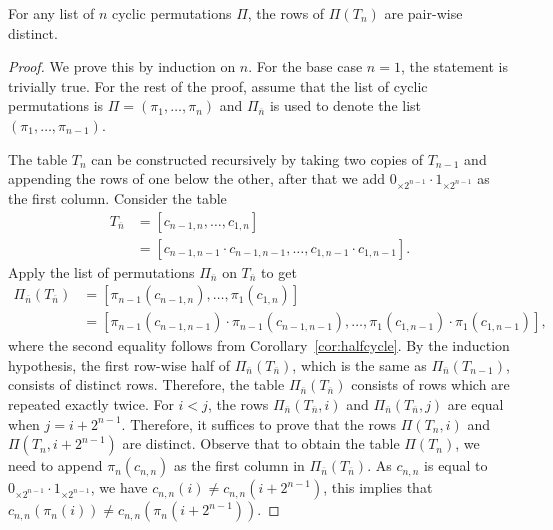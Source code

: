\begin{theorem}\label{thm:rotatebits}
For any list of $n$ cyclic permutations $\Pi$, the rows of $\Pi(T_n)$ are pair-wise distinct.
\end{theorem}
\begin{proof}
 We prove this by induction on $n$. For the base case $n=1$, the statement is  trivially true. For the rest of the proof, assume that the list of cyclic permutations is $\Pi=(\pi_1,\ldots,\pi_n)$ and $\Pi_{\overline{n}}$ is used to denote the list $(\pi_1,\dots,\pi_{n-1})$.
 
The table $T_n$ can be constructed recursively by taking two copies of $T_{n-1}$ and appending the rows of one below the other, after that we add $0_{\times 2^{n-1}}\cdot 1_{\times 2^{n-1}}$ as the first column. Consider the table 
\begin{align*}
T_{\overline n} &= [c_{n-1,n},\dots,c_{1,n}] \\
             &= [c_{n-1,n-1}\cdot c_{n-1,n-1},\dots, c_{1,n-1}\cdot c_{1,n-1}].
\end{align*}
 Apply the list of permutations $\Pi_{\overline{n}}$ on $T_{\overline n}$ to get
\begin{align*}
 \Pi_{\overline{n}}(T_{\overline n}) &= [\pi_{n-1}(c_{n-1,n}), \ldots, \pi_1(c_{1,n})]\\
 			&= [\pi_{n-1}(c_{n-1,n-1})\cdot \pi_{n-1}(c_{n-1,n-1}),\dots, \pi_1(c_{1,n-1})\cdot \pi_1(c_{1,n-1})],
\end{align*}
 where the second equality follows from Corollary~\ref{cor:halfcycle}.
 By the induction hypothesis, the first row-wise half of $\Pi_{\overline{n}}(T_{\overline n})$, which is the same as $\Pi_{\overline{n}}(T_{n-1})$, consists of distinct rows. 
 Therefore, the table $\Pi_{\overline{n}}(T_{\overline n})$ consists of rows which are repeated exactly twice. For $i < j$, the rows $\Pi_{\overline{n}}(T_{\overline n},i)$ and
 $\Pi_{\overline{n}}(T_{\overline n},j)$ are equal when $j=i+2^{n-1}$.
Therefore, it suffices to prove that the rows  $\Pi(T_n,i)$ and $\Pi(T_n,i+2^{n-1})$ are distinct.
 Observe that to obtain the table $\Pi(T_n)$, we need to append $\pi_n(c_{n,n})$ as the first column in $\Pi_{\overline{n}}(T_{\overline n})$. As $c_{n,n}$ is equal to $0_{\times 2^{n-1}}\cdot 1_{\times 2^{n-1}}$, we have $c_{n,n}(i)\neq c_{n,n}(i+2^{n-1})$, this implies that $c_{n,n}(\pi_n(i))\neq c_{n,n}(\pi_n(i+2^{n-1}))$.
\end{proof}


